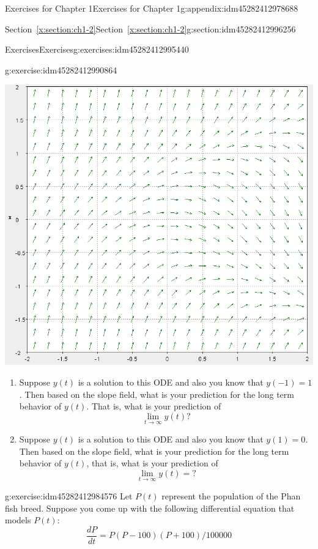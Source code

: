 \documentclass[oneside,10pt,]{book}
\numberwithin{equation}{section}
\numberwithin{equation}{section}
\begin{document}
\begin{appendixptx}{Exercises for Chapter 1}{}{Exercises for Chapter 1}{}{}{g:appendix:idm45282412978688}
\begin{sectionptx}{Section~\ref*{x:section:ch1-2}}{}{Section~\ref*{x:section:ch1-2}}{}{}{g:section:idm45282412996256}
\begin{exercises-subsection-numberless}{Exercises}{}{Exercises}{}{}{g:exercises:idm45282412995440}
\begin{divisionexercise}{2}{}{}{g:exercise:idm45282412990864}
\begin{image}{0}{1}{0}
\includegraphics[width=\linewidth]{images/1.2-2.png}
\end{image}%
%
\begin{enumerate}[label=(\alph*)]
\item{}Suppose \(y(t)\) is a solution to this ODE and also you know that \(y\left(-1\right)=1\). Then based on the slope field, what is your prediction for the long term behavior of \(y(t)\). That is, what is your prediction of%
\begin{equation*}
\lim_{t\to\infty}y(t)?
\end{equation*}
%
\item{}Suppose \(y(t)\) is a solution to this ODE and also you know that \(y\left(1\right)=0\). Then based on the slope field, what is your prediction for the long term behavior of \(y(t)\), that is, what is your prediction of%
\begin{equation*}
\lim_{t\to\infty}y(t)=?
\end{equation*}
%
\end{enumerate}
\end{divisionexercise}%
\begin{divisionexercise}{3}{}{}{g:exercise:idm45282412984576}%
Let \(P(t)\) represent the population of the Phan fish breed. Suppose you come up with the following differential equation that models \(P(t)\):%
\begin{equation*}
\frac{dP}{dt}=P\left(P-100\right)\left(P+100\right)/100000
\end{equation*}

\end{divisionexercise}
\end{exercises-subsection-numberless}
\end{sectionptx}
\end{appendixptx}
\end{document}
